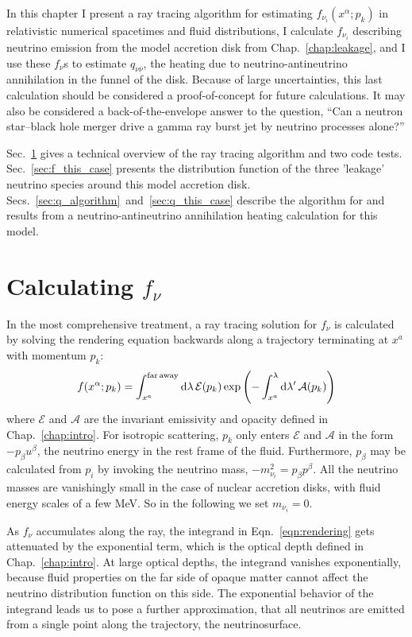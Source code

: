 In this chapter I present a ray tracing algorithm for estimating
$f_{\nu_i}(x^\alpha;p_k)$ in relativistic numerical spacetimes and fluid
distributions, I calculate $f_{\nu_i}$ describing neutrino
emission from the model accretion disk from Chap.~\ref{chap:leakage},
and I use these $f_\nu$s to estimate $q_{\nu\bar{\nu}}$, the heating due to
neutrino-antineutrino annihilation in the funnel of the disk.
Because of large uncertainties,
this last calculation should be considered a proof-of-concept for future
calculations. It may also be considered a back-of-the-envelope answer to
the question, ``Can a neutron star--black hole merger drive a gamma ray burst
jet by neutrino processes alone?''

Sec.~\ref{sec:f_algorithm} gives a technical overview of the ray tracing
algorithm and two code tests. Sec.~\ref{sec:f_this_case} presents the distribution
function of the three 'leakage' neutrino species around this model accretion
disk. Secs.~\ref{sec:q_algorithm}~and~\ref{sec:q_this_case} describe the
algorithm for and results from a neutrino-antineutrino annihilation heating
calculation for this model.

\section{Calculating $f_\nu$}
\label{sec:f_algorithm}

In the most comprehensive treatment, a ray tracing solution for $f_\nu$ is calculated
by solving the rendering equation backwards along a trajectory terminating at
$x^a$ with momentum $p_k$:
\begin{equation}
  \label{eqn:rendering}
  f(x^\alpha;p_k) = \int_{x^a}^{\rm far\,away} \mathrm{d} \lambda \, \mathcal{E}(p_k)
  \exp\left(-\int_{x^a}^\lambda  \mathrm{d} \lambda' \, \mathcal{A}(p_k)\right)
\end{equation}
where $\mathcal{E}$ and $\mathcal{A}$ are the invariant emissivity and opacity
defined in Chap.~\ref{chap:intro}.
For isotropic scattering, $p_k$ only enters $\mathcal{E}$ and $\mathcal{A}$ in the
form $-p_\beta u^\beta$, the neutrino energy in the rest frame of the fluid.
Furthermore, $p_\beta$ may be calculated from $p_i$ by invoking the neutrino mass,
$-m_{\nu_i}^2=p_\beta p^\beta$.
All the neutrino masses are vanishingly small in the case of nuclear
accretion disks, with fluid energy scales of a few MeV. So in the following we
set $m_{\nu_i}=0$.

As $f_\nu$ accumulates along the ray, the integrand in Eqn.~\ref{eqn:rendering}
gets attenuated by the exponential term, which is the optical depth defined in
Chap.~\ref{chap:intro}.
At large optical depths, the integrand vanishes exponentially, because fluid
properties on the far side of opaque matter cannot affect the neutrino
distribution function on this side. The exponential behavior of the integrand
leads us to pose a further approximation, that all neutrinos are emitted from
a single point along the trajectory, the neutrinosurface.

